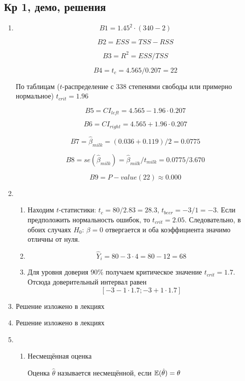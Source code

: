 \documentclass[12pt, a4paper]{article}
\theoremstyle{definition}
\begin{document}
\subsection{Кр 1, демо, решения}

\begin{enumerate}

\item
\[
B1 = 1.45^2 \cdot (340-2)
\]

\[
B2 = ESS = TSS - RSS
\]

\[
B3 = R^2 = ESS / TSS
\]

\[
B4 = t_c = 4.565 / 0.207 = 22
\]

По таблицам ($t$-распределение с 338 степенями свободы или примерно нормальное) $t_{crit} = 1.96$

\[
B5 = CI_{left} = 4.565 - 1.96 \cdot 0.207
\]


\[
B6 = CI_{right} = 4.565 + 1.96 \cdot 0.207
\]


\[
B7 = \hat \beta_{milk} = (0.036 + 0.119) /2 = 0.0775
\]

\[
B8 = se(\hat \beta_{milk}) = \hat \beta_{milk} / t_{milk} = 0.0775 / 3.670
\]

\[
B9 = P-value (22) \approx 0.000
\]


\item
\begin{enumerate}
\item
Находим $t$-статистики: $t_c = 80/2.83 = 28.3$, $t_{beer} = -3/1 = -3$. Если предположить нормальность ошибок, то $t_{crit} = 2.05$. Следовательно, в обоих случаях $H_0$: $\beta = 0$ отвергается и оба коэффициента значимо отличны от нуля.


\item
\[
\hat Y_i = 80 - 3 \cdot 4 = 80 - 12 = 68
\]

\item
Для уровня доверия 90\% получаем критическое значение $t_{crit}=1.7$. Отсюда доверительный интервал равен
\[
[-3-1\cdot 1.7;-3 + 1\cdot 1.7]
\]


\end{enumerate}


\item  Решение изложено в лекциях
\item  Решение изложено в лекциях


\item
\begin{enumerate}
\item Несмещённая оценка

Оценка $\hat \theta$ называется несмещённой, если $\mathbb{E}(\hat\theta)=\theta$


\end{enumerate}
\end{enumerate}
\end{document}
